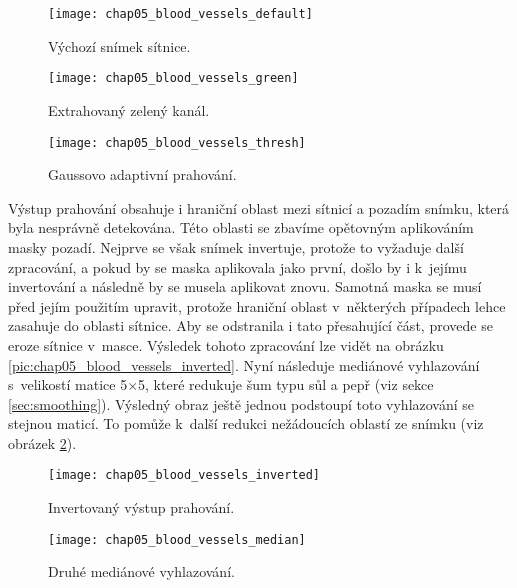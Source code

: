 \begin{figure}[h]
  \begin{minipage}[c]{0.315\textwidth}
    \texttt{[image: chap05\_blood\_vessels\_default]}
    \caption{Výchozí snímek sítnice.}
    \label{pic:chap05_blood_vessels_default}
  \end{minipage}
  \hfill
  \begin{minipage}[c]{0.315\textwidth}
    \texttt{[image: chap05\_blood\_vessels\_green]}
    \caption{Extrahovaný zelený kanál.}
    \label{pic:chap05_blood_vessels_green}
  \end{minipage}
  \hfill
  \begin{minipage}[c]{0.315\textwidth}
    \texttt{[image: chap05\_blood\_vessels\_thresh]}
    \caption{Gaussovo adaptivní prahování.}
    \label{pic:chap05_blood_vessels_thresh}
  \end{minipage}
\end{figure}

Výstup prahování obsahuje i hraniční oblast mezi sítnicí a pozadím snímku, která byla nesprávně detekována. Této oblasti se zbavíme opětovným aplikováním masky pozadí. Nejprve se však snímek invertuje, protože to vyžaduje další zpracování, a pokud by se maska aplikovala jako první, došlo by i k~jejímu invertování a následně by se musela aplikovat znovu. Samotná maska se musí před jejím použitím upravit, protože hraniční oblast v~některých případech lehce zasahuje do oblasti sítnice. Aby se odstranila i tato přesahující část, provede se eroze sítnice v~masce. Výsledek tohoto zpracování lze vidět na obrázku \ref{pic:chap05_blood_vessels_inverted}.
Nyní následuje mediánové vyhlazování s~velikostí matice 5$\times$5, které redukuje šum typu sůl a pepř (viz sekce \ref{sec:smoothing}). Výsledný obraz ještě jednou podstoupí toto vyhlazování se stejnou maticí. To pomůže k~další redukci nežádoucích oblastí ze snímku (viz obrázek \ref{pic:chap05_blood_vessels_median}). 

\begin{figure}[h]
  \begin{minipage}[c]{0.47\textwidth}
    \texttt{[image: chap05\_blood\_vessels\_inverted]}
    \caption{Invertovaný výstup prahování.}
    \label{pic:chap05_blood_vessels_inverted}
  \end{minipage}
  \hfill
  \begin{minipage}[c]{0.47\textwidth}
    \texttt{[image: chap05\_blood\_vessels\_median]}
    \caption{Druhé mediánové vyhlazování.}
    \label{pic:chap05_blood_vessels_median}
  \end{minipage}
\end{figure}

